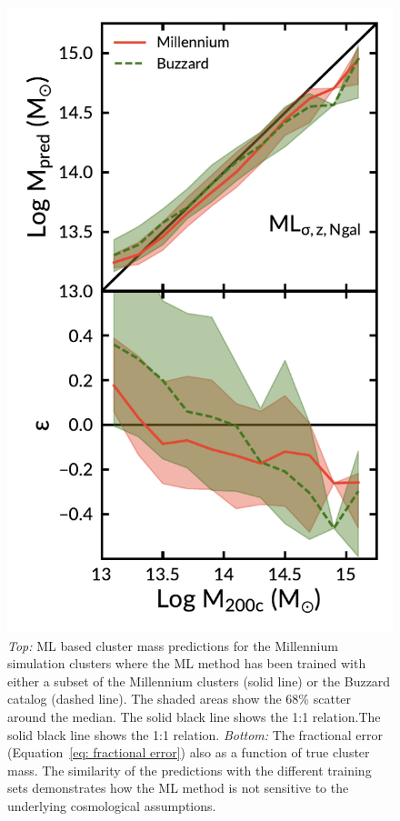 \documentclass[fleqn,usenatbib]{mnras}
\begin{document}
\begin{figure} 
	\includegraphics[width=\columnwidth]{figures/millBuzzComparison.pdf} 
	\caption{\emph{Top:} ML based cluster mass predictions for the Millennium simulation clusters where the ML method has been trained with either a subset of the Millennium clusters (solid line) or the Buzzard catalog (dashed line). The shaded areas show the 68\% scatter around the median. The solid black line shows the 1:1 relation.The solid black line shows the 1:1 relation. \emph{Bottom:} The fractional error (Equation~\ref{eq: fractional error}) also as a function of true cluster mass. The similarity of the predictions with the different training sets demonstrates how the ML method is not sensitive to the underlying cosmological assumptions.} \label{fig: mill buzz comparison} 
\end{figure}
\end{document}
